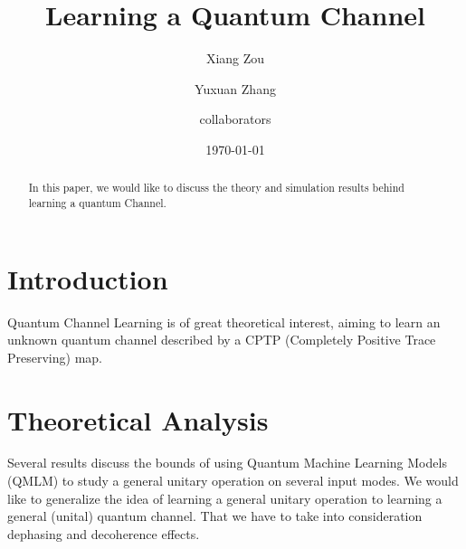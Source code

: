 \documentclass[%
 reprint,
 amsmath,amssymb,
 aps,
]{revtex4-2}
\begin{document}

\title{Learning a Quantum Channel}%

\author{Xiang Zou}
%
\author{Yuxuan Zhang}%
%
\author{collaborators}%
%
\date{\today}%

\begin{abstract}
In this paper, we would like to discuss the theory and simulation results behind learning a quantum Channel.
\end{abstract}

\maketitle


\section{Introduction}

Quantum Channel Learning is of great theoretical interest, aiming to learn an unknown quantum channel described by a CPTP (Completely Positive Trace Preserving) map.

\section{Theoretical Analysis}
Several results discuss the bounds of using Quantum Machine Learning Models (QMLM) to study a general unitary operation on several input modes. We would like to generalize the idea of learning a general unitary operation to learning a general (unital) quantum channel. That we have to take into consideration dephasing and decoherence effects.
\end{document}
